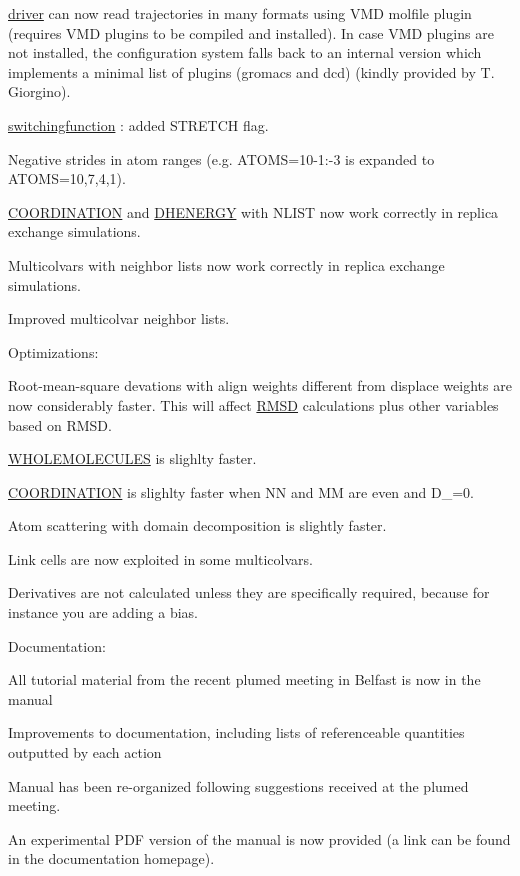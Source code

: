 \begin{DoxyItemize}
\begin{DoxyItemize}
\item \hyperlink{driver}{driver} can now read trajectories in many formats using V\+M\+D molfile plugin (requires V\+M\+D plugins to be compiled and installed). In case V\+M\+D plugins are not installed, the configuration system falls back to an internal version which implements a minimal list of plugins (gromacs and dcd) (kindly provided by T. Giorgino).
\item \hyperlink{switchingfunction}{switchingfunction} \+: added S\+T\+R\+E\+T\+C\+H flag.
\item Negative strides in atom ranges (e.\+g. A\+T\+O\+M\+S=10-\/1\+:-\/3 is expanded to A\+T\+O\+M\+S=10,7,4,1).
\item \hyperlink{COORDINATION}{C\+O\+O\+R\+D\+I\+N\+A\+T\+I\+O\+N} and \hyperlink{DHENERGY}{D\+H\+E\+N\+E\+R\+G\+Y} with N\+L\+I\+S\+T now work correctly in replica exchange simulations.
\item Multicolvars with neighbor lists now work correctly in replica exchange simulations.
\item Improved multicolvar neighbor lists.
\end{DoxyItemize}
\item Optimizations\+:
\begin{DoxyItemize}
\item Root-\/mean-\/square devations with align weights different from displace weights are now considerably faster. This will affect \hyperlink{RMSD}{R\+M\+S\+D} calculations plus other variables based on R\+M\+S\+D.
\item \hyperlink{WHOLEMOLECULES}{W\+H\+O\+L\+E\+M\+O\+L\+E\+C\+U\+L\+E\+S} is slighlty faster.
\item \hyperlink{COORDINATION}{C\+O\+O\+R\+D\+I\+N\+A\+T\+I\+O\+N} is slighlty faster when N\+N and M\+M are even and D\+\_=0.
\item Atom scattering with domain decomposition is slightly faster.
\item Link cells are now exploited in some multicolvars.
\item Derivatives are not calculated unless they are specifically required, because for instance you are adding a bias.
\end{DoxyItemize}
\item Documentation\+:
\begin{DoxyItemize}
\item All tutorial material from the recent plumed meeting in Belfast is now in the manual
\item Improvements to documentation, including lists of referenceable quantities outputted by each action
\item Manual has been re-\/organized following suggestions received at the plumed meeting.
\item An experimental P\+D\+F version of the manual is now provided (a link can be found in the documentation homepage).
\end{DoxyItemize}
\end{DoxyItemize}

